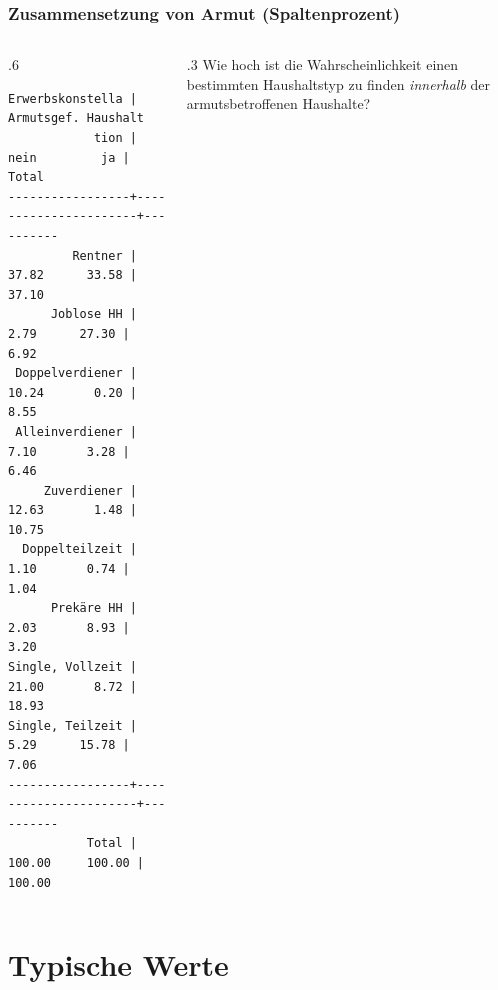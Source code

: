 \begin{frame}[fragile]
\frametitle{Zusammensetzung von Armut (Spaltenprozent)}
\begin{columns}
\begin{column}{.6\linewidth}
\begin{Verbatim}[fontsize=\small]
Erwerbskonstella |  Armutsgef. Haushalt
            tion |      nein         ja |     Total
-----------------+----------------------+----------
         Rentner |     37.82      33.58 |     37.10 
      Joblose HH |      2.79      27.30 |      6.92 
 Doppelverdiener |     10.24       0.20 |      8.55 
 Alleinverdiener |      7.10       3.28 |      6.46 
     Zuverdiener |     12.63       1.48 |     10.75 
  Doppelteilzeit |      1.10       0.74 |      1.04 
      Prekäre HH |      2.03       8.93 |      3.20 
Single, Vollzeit |     21.00       8.72 |     18.93 
Single, Teilzeit |      5.29      15.78 |      7.06 
-----------------+----------------------+----------
           Total |    100.00     100.00 |    100.00 
\end{Verbatim}
\end{column}
\begin{column}{.3\linewidth}
Wie hoch ist die Wahrscheinlichkeit einen bestimmten Haushaltstyp zu finden \textit{innerhalb} der armutsbetroffenen Haushalte? 
\end{column}
\end{columns}

\end{frame}

\section{Typische Werte}

